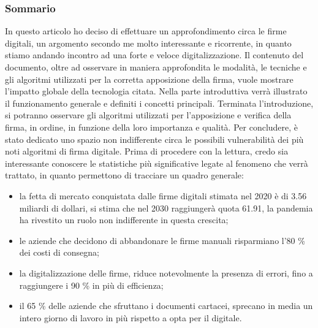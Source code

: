 \begin{center}
	\subsubsection{Sommario}
\end{center}

		In questo articolo ho deciso di effettuare un approfondimento circa le firme digitali, un argomento secondo me molto interessante e ricorrente, in quanto stiamo andando incontro ad una forte e veloce digitalizzazione. Il contenuto del documento, oltre ad osservare in maniera approfondita le modalità, le tecniche e gli algoritmi utilizzati per la corretta apposizione della firma, vuole mostrare l'impatto globale della tecnologia citata. Nella parte introduttiva verrà illustrato il funzionamento generale e definiti i concetti principali. Terminata l'introduzione, si potranno osservare gli algoritmi utilizzati per l'apposizione e verifica della firma, in ordine, in funzione della loro importanza e qualità. Per concludere, è stato dedicato uno spazio non indifferente circa le possibili vulnerabilità dei più noti algoritmi di firma digitale. Prima di procedere con la lettura, credo sia interessante conoscere le statistiche più significative legate al fenomeno che verrà trattato, in quanto permettono di tracciare un quadro generale:
		\\
		\begin{itemize}
			\item la fetta di mercato conquistata dalle firme digitali stimata nel 2020 è di 3.56 miliardi di dollari, si stima che nel 2030 raggiungerà quota 61.91, la pandemia ha rivestito un ruolo non indifferente in questa crescita;
			\item le aziende che decidono di abbandonare le firme manuali risparmiano l'80 \% dei costi di consegna;
			\item la digitalizzazione delle firme, riduce notevolmente la presenza di errori, fino a raggiungere i 90 \% in più di efficienza;
			\item il 65 \% delle aziende che sfruttano i documenti cartacei, sprecano in media un intero giorno di lavoro in più rispetto a opta per il digitale.
		\end{itemize}